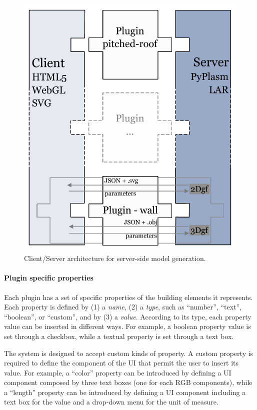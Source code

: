 \begin{figure}[htbp] %
   \centering

   \includegraphics[width=0.6\linewidth]{images/architecture-h}

   \caption{Client/Server architecture for server-side model generation.}
   \label{fig:c-s-arch}
\end{figure}

\paragraph{Plugin specific properties}

\noindent
Each plugin has a set of specific properties of the building elements it represents.
Each property is defined by (1) a \emph{name}, (2) a \emph{type}, such as ``number'', ``text'', ``boolean'', or ``custom'', and by  (3) a \emph{value}.
According to its type, each property value can be inserted in different ways.
For example, a boolean property value is set through a checkbox, while a textual property is set through a text box.

The system is designed to accept custom kinds of property. A custom property is required to define the component of the UI that permit the user to insert its value.
For example, a ``color'' property can be introduced by defining a UI component composed by three text boxes (one for each RGB components), while a ``length'' property can be introduced by defining a UI component including a text box for the value and a drop-down menu for the unit of measure.

